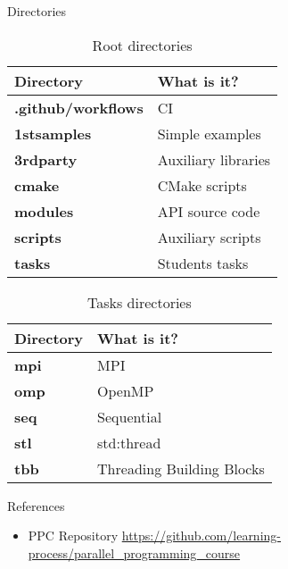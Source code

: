 \documentclass{beamer}
\begin{document}
\begin{frame}[fragile]{Directories}
  \begin{table}[h!]
    \resizebox{8cm}{!} {
      \begin{tabular}{| p{4.2 cm} | p{4.2 cm} |}
      \hline
      \textbf{Directory} & \textbf{What is it?} \\
      \hline
      \textbf{.github/workflows} & CI \\
      \hline
      \textbf{1stsamples} & Simple examples \\
      \hline
      \textbf{3rdparty} & Auxiliary libraries \\
      \hline
      \textbf{cmake} & CMake scripts \\
      \hline
      \textbf{modules} & API source code \\
      \hline
      \textbf{scripts} & Auxiliary scripts \\
      \hline
      \textbf{tasks} & Students tasks \\
      \hline
    \end{tabular}
    }
    \caption{Root directories}
  \end{table}

  \begin{table}[h!]
    \resizebox{8cm}{!} {
    \begin{tabular}{| p{4.2 cm} | p{4.2 cm} |}
      \hline
      \textbf{Directory} & \textbf{What is it?} \\
      \hline
      \textbf{mpi} & MPI \\
      \hline
      \textbf{omp} & OpenMP \\
      \hline
      \textbf{seq} & Sequential \\
      \hline
      \textbf{stl} & std:thread \\
      \hline
      \textbf{tbb} & Threading Building Blocks \\
      \hline
    \end{tabular}
    }
    \caption{Tasks directories}
  \end{table}

\end{frame}

\begin{frame}{References}
  \begin{itemize}
    \item PPC Repository \href{https://github.com/learning-process/parallel\_programming\_course}{https://github.com/learning-process/parallel\_programming\_course}
  \end{itemize}
\end{frame}
\end{document}
